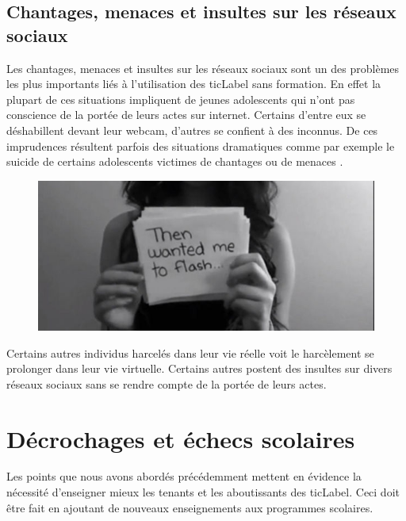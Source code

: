 
\subsection{Chantages, menaces et insultes sur les réseaux sociaux}
Les chantages, menaces et insultes sur les réseaux sociaux sont un des problèmes les plus importants liés à l'utilisation des \gls{ticLabel} sans formation. En effet la plupart de ces situations impliquent de jeunes adolescents qui n'ont pas conscience de la portée de leurs actes sur internet. Certains d'entre eux se déshabillent devant leur webcam, d'autres se confient à des inconnus. De ces imprudences résultent parfois des situations dramatiques comme par exemple le suicide de certains adolescents victimes de chantages ou de menaces \cite{chantage_facebook, harcel_facebook}.

\begin{figure}[h]
\centering
\includegraphics[scale=1]{../resources/illustrations/Amanda_Todd}
\end{figure}

Certains autres individus harcelés dans leur vie réelle voit le harcèlement se prolonger dans leur vie virtuelle. Certains autres postent des insultes sur divers réseaux sociaux sans se rendre compte de la portée de leurs actes.




\section{Décrochages et échecs scolaires}
Les points que nous avons abordés précédemment mettent en évidence la nécessité d'enseigner mieux les tenants et les aboutissants des \gls{ticLabel}. Ceci doit être fait en ajoutant de nouveaux enseignements aux programmes scolaires.

